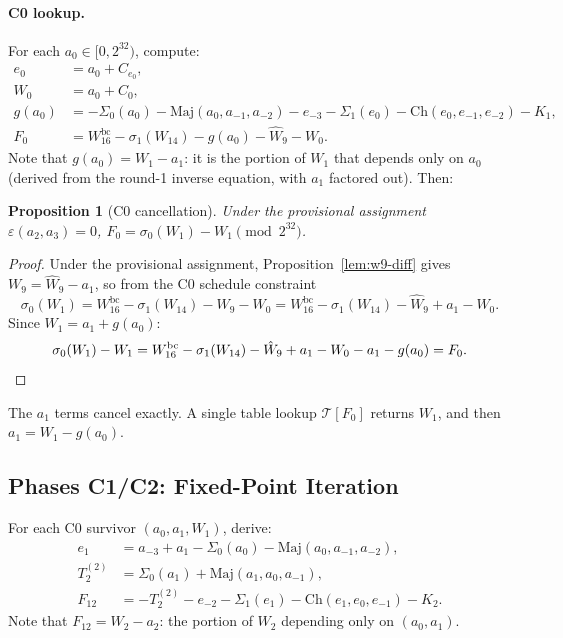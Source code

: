 \documentclass[11pt,a4paper]{article}
\newtheorem{proposition}{Proposition}
\newcommand{\Sig}[1]{\Sigma_{#1}}
\newcommand{\sig}[1]{\sigma_{#1}}
\newcommand{\Maj}{\mathrm{Maj}}
\newcommand{\Ch}{\mathrm{Ch}}
\begin{document}
\paragraph{C0 lookup.}
For each $a_0 \in [0, 2^{32})$, compute:
\begin{align}
  e_0 &= a_0 + C_{e_0}, \label{eq:e0} \\
  W_0 &= a_0 + C_0, \label{eq:W0} \\
  g(a_0) &= -\Sig{0}(a_0) - \Maj(a_0,a_{-1},a_{-2})
            - e_{-3} - \Sig{1}(e_0) - \Ch(e_0,e_{-1},e_{-2}) - K_1,
  \label{eq:g} \\
  F_0 &= W_{16}^{\mathrm{bc}} - \sig{1}(W_{14}) - g(a_0)
         - \hat{W}_9 - W_0. \label{eq:F0}
\end{align}
Note that $g(a_0) = W_1 - a_1$: it is the portion of $W_1$ that
depends only on $a_0$ (derived from the round-1 inverse equation,
with $a_1$ factored out).  Then:

\begin{proposition}[C0 cancellation]
\label{prop:c0}
Under the provisional assignment $\varepsilon(a_2,a_3)=0$,
$F_0 = \sig{0}(W_1) - W_1 \pmod{2^{32}}$.
\end{proposition}
\begin{proof}
Under the provisional assignment, Proposition~\ref{lem:w9-diff} gives
$W_9 = \hat{W}_9 - a_1$, so from the C0 schedule constraint
\[
  \sig{0}(W_1)
  = W_{16}^{\mathrm{bc}} - \sig{1}(W_{14}) - W_9 - W_0
  = W_{16}^{\mathrm{bc}} - \sig{1}(W_{14}) - \hat{W}_9 + a_1 - W_0.
\]
Since $W_1 = a_1 + g(a_0)$:
\[
  \sig{0}(W_1) - W_1
  = W_{16}^{\mathrm{bc}} - \sig{1}(W_{14}) - \hat{W}_9 + a_1 - W_0
    - a_1 - g(a_0) = F_0.
\qedhere
\]
\end{proof}

The $a_1$ terms cancel exactly.  A single table lookup
$\mathcal{T}[F_0]$ returns $W_1$, and then $a_1 = W_1 - g(a_0)$.

\subsection{Phases C1/C2: Fixed-Point Iteration}
\label{sec:C1C2}

For each C0 survivor $(a_0, a_1, W_1)$, derive:
\begin{align}
  e_1 &= a_{-3} + a_1 - \Sig{0}(a_0) - \Maj(a_0,a_{-1},a_{-2}), \\
  T_2^{(2)} &= \Sig{0}(a_1) + \Maj(a_1,a_0,a_{-1}), \\
  F_{12} &= -T_2^{(2)} - e_{-2} - \Sig{1}(e_1) - \Ch(e_1,e_0,e_{-1}) - K_2.
\end{align}
Note that $F_{12} = W_2 - a_2$: the portion of $W_2$ depending only on
$(a_0, a_1)$.
\end{document}
